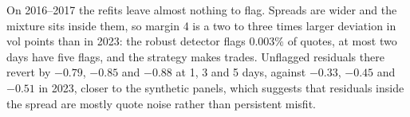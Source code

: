 On 2016--2017 the refits leave almost nothing to flag. Spreads are wider and the mixture sits inside
them, so margin 4 is a two to three times larger deviation in vol points than in 2023: the robust
detector flags 0.003\% of quotes, at most two days have five flags, and the strategy makes
\btRepTrades{} trades. Unflagged residuals there revert by $-0.79$, $-0.85$ and $-0.88$ at 1, 3 and
5 days, against $-0.33$, $-0.45$ and $-0.51$ in 2023, closer to the synthetic panels, which suggests
that residuals inside the spread are mostly quote noise rather than persistent misfit.

